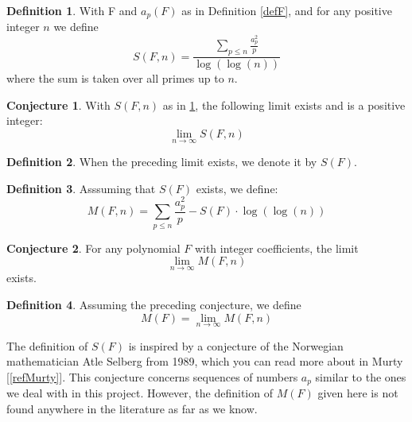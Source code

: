 \documentclass{article}
\theoremstyle{definition}
\newtheorem{definition}{Definition}[section]
\newtheorem{conjecture}{Conjecture}[section]
\theoremstyle{remark}
\begin{document}
\begin{definition}\label{defS(F,n)}
With F and $a_p(F)$ as in Definition \ref{defF}, and for any positive integer $n$ we define
$$S(F,n) = \frac{\sum_{p\leq n}\frac{a_p^2}{p}}{\log(\log(n))} $$
where the sum is taken over all primes up to $n$.
\end{definition}

\begin{conjecture}
With $S(F,n)$ as in \ref{defS(F,n)}, the following limit exists and is a positive integer:
$$\lim_{n\rightarrow \infty} S(F,n) $$
\end{conjecture}

\begin{definition}
When the preceding limit exists, we denote it by $S(F)$.
\end{definition}

\begin{definition}
Asssuming that $S(F)$ exists, we define:
$$M(F,n) = \sum_{p\leq n}\frac{a_p^2}{p} - S(F)\cdot \log(\log(n)) $$
\end{definition}

\begin{conjecture}
For any polynomial $F$ with integer coefficients, the limit $$\lim_{n \rightarrow \infty } M(F,n)$$
exists.
\end{conjecture}

\begin{definition}
Assuming the preceding conjecture, we define
$$M(F)=\lim_{n \rightarrow \infty} M(F,n)$$
\end{definition}

The definition of $S(F)$ is inspired by a conjecture of the Norwegian mathematician Atle Selberg from 1989, which you can read more about in Murty [\ref{refMurty}]. This conjecture concerns sequences of numbers $a_p$ similar to the ones we deal with in this project. However, the definition of $M(F)$ given here is not found anywhere in the literature as far as we know.
\end{document}
